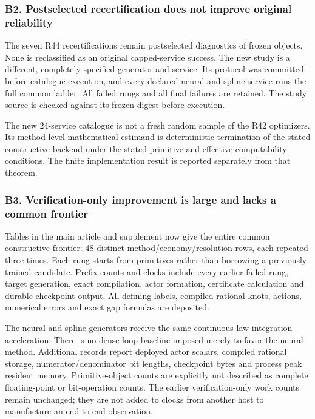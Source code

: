 \documentclass[ecta,nameyear,draft]{econsocart}
\begin{document}
\hypertarget{b2-postselected-recertification-does-not-improve-original-reliability}{%
\subsubsection{B2. Postselected recertification does not improve
original
reliability}\label{b2-postselected-recertification-does-not-improve-original-reliability}}

The seven R44 recertifications remain postselected diagnostics of frozen
objects. None is reclassified as an original capped-service success. The
new study is a different, completely specified generator and service.
Its protocol was committed before catalogue execution, and every
declared neural and spline service runs the full common ladder. All
failed rungs and all final failures are retained. The study source is
checked against its frozen digest before execution.

The new 24-service catalogue is not a fresh random sample of the R42
optimizers. Its method-level mathematical estimand is deterministic
termination of the stated constructive backend under the stated
primitive and effective-computability conditions. The finite
implementation result is reported separately from that theorem.

\hypertarget{b3-verification-only-improvement-is-large-and-lacks-a-common-frontier}{%
\subsubsection{B3. Verification-only improvement is large and lacks a
common
frontier}\label{b3-verification-only-improvement-is-large-and-lacks-a-common-frontier}}

Tables in the main article and supplement now give the entire common
constructive frontier: 48 distinct method/economy/resolution rows, each
repeated three times. Each rung starts from primitives rather than
borrowing a previously trained candidate. Prefix counts and clocks
include every earlier failed rung, target generation, exact compilation,
actor formation, certificate calculation and durable checkpoint output.
All defining labels, compiled rational knots, actions, numerical errors
and exact gap formulas are deposited.

The neural and spline generators receive the same continuous-law
integration acceleration. There is no dense-loop baseline imposed merely
to favor the neural method. Additional records report deployed actor
scalars, compiled rational storage, numerator/denominator bit lengths,
checkpoint bytes and process peak resident memory. Primitive-object
counts are explicitly not described as complete floating-point or
bit-operation counts. The earlier verification-only work counts remain
unchanged; they are not added to clocks from another host to manufacture
an end-to-end observation.
\end{document}
